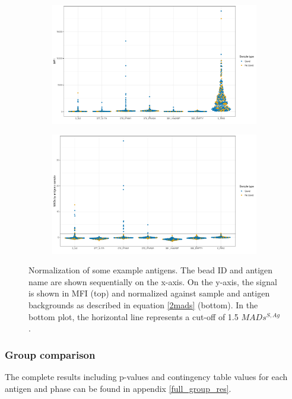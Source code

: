\documentclass{article}
\begin{document}
\begin{figure}[H]
	\centering
	\begin{subfigure}[H]{\linewidth}
		\includegraphics[width=\linewidth]{figures/norm_mfi.pdf}
	\end{subfigure}
	\begin{subfigure}[H]{\linewidth}
		\hspace{2mm}
		\includegraphics[width=0.98\linewidth]{figures/norm_mads2.pdf}
	\end{subfigure}
	\caption{Normalization of some example antigens. The bead ID and antigen name are shown sequentially on the x-axis. On the y-axis, the signal is shown in MFI (top) and normalized against sample and antigen backgrounds as described in equation \ref{2mads} (bottom). In the bottom plot, the horizontal line represents a cut-off of 1.5 $MADs^{S,Ag}$.}
	\label{mfi2mads}
\end{figure}

\subsubsection{Group comparison}\label{res_group_comp}
The complete results including p-values and contingency table values for each antigen and phase can be found in appendix \ref{full_group_res}.
\end{document}
